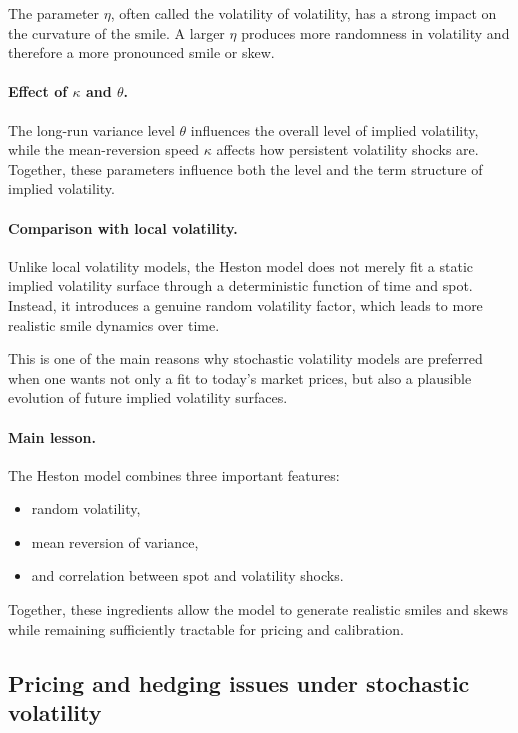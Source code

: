 \documentclass[11pt]{article}
\theoremstyle{plain}
\theoremstyle{definition}
\theoremstyle{remark}
\begin{document}
The parameter \(\eta\), often called the volatility of volatility, has a
strong impact on the curvature of the smile.
A larger \(\eta\) produces more randomness in volatility and therefore a
more pronounced smile or skew.

\paragraph{Effect of \(\kappa\) and \(\theta\).}

The long-run variance level \(\theta\) influences the overall level of
implied volatility, while the mean-reversion speed \(\kappa\) affects
how persistent volatility shocks are.
Together, these parameters influence both the level and the term
structure of implied volatility.

\paragraph{Comparison with local volatility.}

Unlike local volatility models, the Heston model does not merely fit a
static implied volatility surface through a deterministic function of
time and spot.
Instead, it introduces a genuine random volatility factor, which leads
to more realistic smile dynamics over time.

This is one of the main reasons why stochastic volatility models are
preferred when one wants not only a fit to today's market prices, but
also a plausible evolution of future implied volatility surfaces.

\paragraph{Main lesson.}

The Heston model combines three important features:
\begin{itemize}[leftmargin=1.4em]
    \item random volatility,
    \item mean reversion of variance,
    \item and correlation between spot and volatility shocks.
\end{itemize}

Together, these ingredients allow the model to generate realistic
smiles and skews while remaining sufficiently tractable for pricing and
calibration.

\subsection{Pricing and hedging issues under stochastic volatility}
\end{document}
